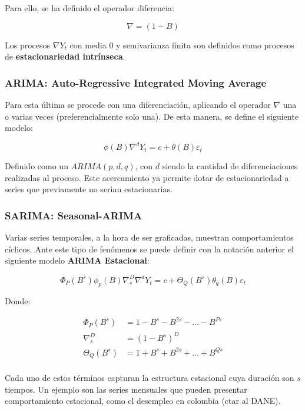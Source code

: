 \documentclass[10pt,twoside,xcolor=table,x11anmes]{IEEEtran}
\begin{document}
Para ello, se ha definido el operador diferencia:

$$\nabla=(1-B)$$

Los procesos $\nabla Y_t$ con media 0 y semivarianza finita son definidos como procesos de \textbf{estacionariedad intrínseca}.

\subsubsection{ARIMA: Auto-Regressive Integrated Moving Average}

Para esta última se procede con una diferenciación, aplicando el operador $\nabla$ una o varias veces (preferencialmente solo una). De esta manera, se define el siguiente modelo:

$$\phi(B)\nabla^{d}Y_t=c + \theta(B)\varepsilon_t$$

Definido como un $ARIMA(p,d,q)$, con $d$ siendo la cantidad de diferenciaciones realizadas al proceso. Este acercamiento ya permite dotar de estacionariedad a series que previamente no serian estacionarias.

\subsubsection{SARIMA: Seasonal-ARIMA}

Varias series temporales, a la hora de ser graficadas, muestran comportamientos cíclicos. Ante este tipo de fenómenos se puede definir con la notación anterior el siguiente modelo \textbf{ARIMA Estacional}:

$$\Phi_P(B^s)\phi_p(B)\nabla_s^{D}\nabla^{d}Y_t=c + \Theta_Q(B^s)\theta_q(B)\varepsilon_t$$

Donde:

\begin{equation*}
    \begin{split}
        \Phi_P(B^s)&=1-B^{s}-B^{2s}-\dots-B^{Ps}\\
        \nabla_s^{D}&=(1-B^s)^D\\
        \Theta_Q(B^s)&=1+B^{s}+B^{2s}+\dots+B^{Qs}\\
    \end{split}
\end{equation*}

Cada uno de estos términos capturan la estructura estacional cuya duración son $s$ tiempos. Un ejemplo son las series mensuales que pueden presentar comportamiento estacional, como el desempleo en colombia (ctar al DANE).
\end{document}
